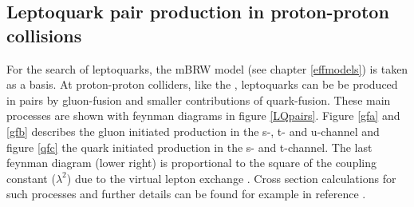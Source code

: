 \subsection{Leptoquark pair production in proton-proton collisions}\label{LQpp}
For the search of leptoquarks, the mBRW model (see chapter \ref{effmodels}) is taken as a basis.\newline 
At proton-proton colliders, like the {\LHC}, leptoquarks can be be produced in pairs by gluon-fusion and smaller contributions of quark-fusion. These main processes are shown with feynman diagrams in figure \ref{LQpairs}. Figure \ref{gfa} and \ref{gfb} describes the gluon initiated production in the s-, t- and u-channel and figure \ref{qfc} the quark initiated production in the s- and t-channel. The last feynman diagram (lower right) is proportional to the square of the coupling constant ($\lambda^2$) due to the virtual lepton exchange \cite{hunter}\cite{Hewett}. Cross section calculations for such processes and further details can be found for example in reference \cite{Kramer}.  
%
